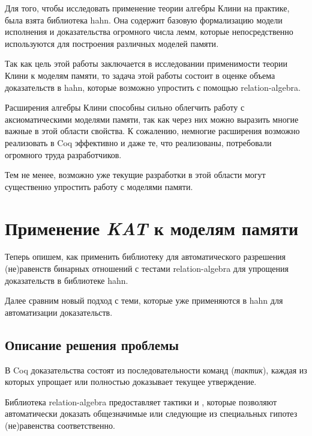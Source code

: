 \documentclass[times
              ]{itmo-student-thesis}
\begin{document}

    Для того, чтобы исследовать применение теории алгебры Клини на практике, была взята библиотека hahn\cite{hahn}.
    Она содержит базовую формализацию модели исполнения и доказательства огромного числа лемм, которые
    непосредственно используются для построения различных моделей памяти\cite{imm}.

    Так как цель этой работы заключается в исследовании применимости теории Клини к моделям памяти,
    то задача этой работы состоит в оценке объема доказательств в hahn, которые возможно упростить с помощью relation-algebra.


  \chapterconclusion
    Расширения алгебры Клини способны сильно облегчить работу с аксиоматическими моделями памяти,
    так как через них можно выразить многие важные в этой области свойства. К сожалению, немногие
    расширения возможно реализовать в Coq эффективно и даже те, что реализованы, потребовали огромного труда разработчиков.

    Тем не менее, возможно уже текущие разработки в этой области могут существенно упростить работу с моделями памяти.

\chapter{Применение \textit{KAT} к моделям памяти}

  Теперь опишем, как применить библиотеку для автоматического разрешения (не)равенств бинарных
  отношений с тестами relation-algebra для упрощения доказательств в библиотеке hahn.

  Далее сравним новый подход с теми, которые уже применяются в hahn для автоматизации доказательств.

  \section{Описание решения проблемы}

    В Coq доказательства состоят из последовательности команд (\textit{тактик}), каждая из
    которых упрощает или полностью доказывает текущее утверждение.

    Библиотека relation-algebra предоставляет тактики  и ,
    которые позволяют автоматически доказать общезначимые или следующие из специальных гипотез
    (не)равенства соответственно.
\end{document}
